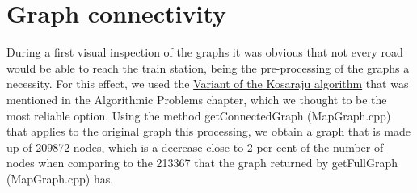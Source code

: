 \chapter{Graph connectivity} \label{connectivity-graphs}
During a first visual inspection of the graphs it was obvious that not every road  would be able to reach the train station, being the pre-processing of the graphs a necessity.
For this effect, we used the \hyperref[algorithm-scc-kosaraju-v]{Variant of the Kosaraju algorithm} that was mentioned in the Algorithmic Problems chapter, which we thought to be the most reliable option.
Using the method getConnectedGraph (MapGraph.cpp) that applies to the original graph this processing, we obtain a graph that is made up of 209872 nodes, which is a decrease close to 2 per cent of the number of nodes when comparing to the  213367 that the graph returned by getFullGraph (MapGraph.cpp) has.